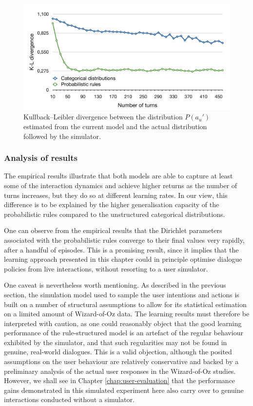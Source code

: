 \begin{figure}[p] 
\begin{center}
\includegraphics[scale=0.42]{imgs/kldivergence.pdf}
\end{center} 
\caption{Kullback--Leibler divergence between the distribution $P(a_u')$ estimated from the current model and the actual distribution followed by the simulator.}
\label{fig:divergence}
\end{figure}

\subsubsection*{Analysis of results}

The empirical results illustrate that both models are able to capture at least some of the interaction dynamics and achieve higher returns as the number of turns increases, but they do so at different learning rates.  In our view, this difference is to be explained by the higher generalisation capacity of the probabilistic rules compared to the unstructured categorical distributions.  

One can observe from the empirical results that the Dirichlet parameters associated with the probabilistic rules converge to their final values very rapidly, after a handful of episodes.  This is a promising result, since it implies that the learning approach presented in this chapter could in principle optimise dialogue policies from live interactions, without resorting to a user simulator.

One caveat is nevertheless worth mentioning.  As described in the previous section, the simulation model used to sample the user intentions and actions is built on a number of structural assumptions to allow for its statistical estimation on a limited amount of Wizard-of-Oz data.  The learning results must therefore be interpreted with caution, as one could reasonably object that the good learning performance of the rule-structured model is an artefact of the regular behaviour exhibited by the simulator, and that such regularities may not be found in genuine, real-world dialogues. This is a valid objection, although the posited assumptions on the user behaviour are relatively conservative and backed by a preliminary analysis of the actual user responses in the Wizard-of-Oz studies. However, we shall see in Chapter \ref{chap:user-evaluation} that the performance gains demonstrated in this simulated experiment here also carry over to genuine interactions conducted without a simulator. 

